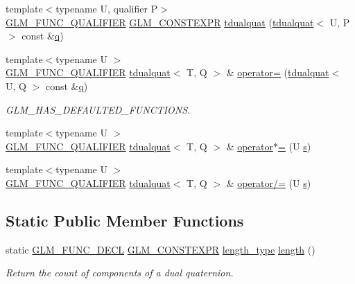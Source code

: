 \begin{DoxyCompactItemize}
{\footnotesize template$<$typename U, qualifier P$>$ }\\\hyperlink{setup_8hpp_a33fdea6f91c5f834105f7415e2a64407}{G\+L\+M\+\_\+\+F\+U\+N\+C\+\_\+\+Q\+U\+A\+L\+I\+F\+I\+ER} \hyperlink{setup_8hpp_a08b807947b47031d3a511f03f89645ad}{G\+L\+M\+\_\+\+C\+O\+N\+S\+T\+E\+X\+PR} \hyperlink{structglm_1_1tdualquat_a00f0899c1213aa991a65dfaf8d15fba5}{tdualquat} (\hyperlink{structglm_1_1tdualquat}{tdualquat}$<$ U, P $>$ const \&\hyperlink{_s_d_l__opengl_8h_a8fc1e7b9baaae687804c7eed46ca09c6}{q})
\item 
{\footnotesize template$<$typename U $>$ }\\\hyperlink{setup_8hpp_a33fdea6f91c5f834105f7415e2a64407}{G\+L\+M\+\_\+\+F\+U\+N\+C\+\_\+\+Q\+U\+A\+L\+I\+F\+I\+ER} \hyperlink{structglm_1_1tdualquat}{tdualquat}$<$ T, Q $>$ \& \hyperlink{structglm_1_1tdualquat_a6bdd31159c6bf9d7bca75971c2a1e512}{operator=} (\hyperlink{structglm_1_1tdualquat}{tdualquat}$<$ U, Q $>$ const \&\hyperlink{_s_d_l__opengl_8h_a8fc1e7b9baaae687804c7eed46ca09c6}{q})
\begin{DoxyCompactList}\small\item\em G\+L\+M\+\_\+\+H\+A\+S\+\_\+\+D\+E\+F\+A\+U\+L\+T\+E\+D\+\_\+\+F\+U\+N\+C\+T\+I\+O\+NS. \end{DoxyCompactList}\item 
{\footnotesize template$<$typename U $>$ }\\\hyperlink{setup_8hpp_a33fdea6f91c5f834105f7415e2a64407}{G\+L\+M\+\_\+\+F\+U\+N\+C\+\_\+\+Q\+U\+A\+L\+I\+F\+I\+ER} \hyperlink{structglm_1_1tdualquat}{tdualquat}$<$ T, Q $>$ \& \hyperlink{structglm_1_1tdualquat_ab300e10bf89a90d694526c75ed423546}{operator$\ast$=} (U \hyperlink{_s_d_l__opengl_8h_a4af680a6c683f88ed67b76f207f2e6e4}{s})
\item 
{\footnotesize template$<$typename U $>$ }\\\hyperlink{setup_8hpp_a33fdea6f91c5f834105f7415e2a64407}{G\+L\+M\+\_\+\+F\+U\+N\+C\+\_\+\+Q\+U\+A\+L\+I\+F\+I\+ER} \hyperlink{structglm_1_1tdualquat}{tdualquat}$<$ T, Q $>$ \& \hyperlink{structglm_1_1tdualquat_a57b7a39ce0aee940340ac0f20e65963c}{operator/=} (U \hyperlink{_s_d_l__opengl_8h_a4af680a6c683f88ed67b76f207f2e6e4}{s})
\end{DoxyCompactItemize}
\subsection*{Static Public Member Functions}
\begin{DoxyCompactItemize}
\item 
static \hyperlink{setup_8hpp_ab2d052de21a70539923e9bcbf6e83a51}{G\+L\+M\+\_\+\+F\+U\+N\+C\+\_\+\+D\+E\+CL} \hyperlink{setup_8hpp_a08b807947b47031d3a511f03f89645ad}{G\+L\+M\+\_\+\+C\+O\+N\+S\+T\+E\+X\+PR} \hyperlink{structglm_1_1tdualquat_ad9fa4fd7f84d17bebd3efed6b5455d80}{length\+\_\+type} \hyperlink{structglm_1_1tdualquat_a79fe24c72a3f26d906b080de34b92b4e}{length} ()
\begin{DoxyCompactList}\small\item\em Return the count of components of a dual quaternion. \end{DoxyCompactList}\end{DoxyCompactItemize}
